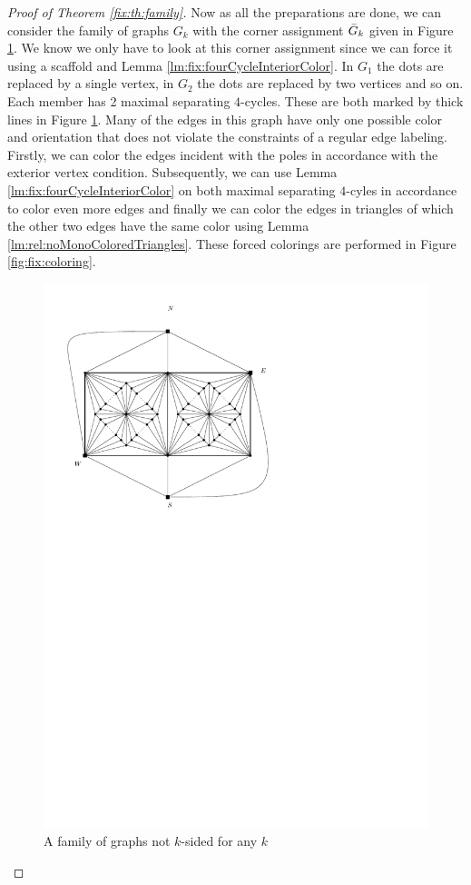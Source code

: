 \begin{proof}[Proof of Theorem \ref{fix:th:family}]
  Now as all the preparations are done, we can consider the family of graphs $G_k$ with the corner assignment $\bar{G}_k$ given in Figure \ref{fig:fix:manymany0}.
  We know we only have to look at this corner assignment since we can force it using a scaffold and Lemma \ref{lm:fix:fourCycleInteriorColor}.
  In $G_1$ the dots are replaced by a single vertex, in $G_2$ the dots are replaced by two vertices and so on.
  Each member has 2 maximal separating $4$-cycles.
  These are both marked by thick lines in Figure \ref{fig:fix:manymany0}.
  Many of the edges in this graph have only one possible color and orientation that does not violate the constraints of a regular edge labeling.
  Firstly, we can color the edges incident with the poles in accordance with the exterior vertex condition.
  Subsequently, we can use Lemma \ref{lm:fix:fourCycleInteriorColor} on both maximal separating $4$-cyles in accordance to color even more edges and finally we can color the edges in triangles of which the other two edges have  the same color using Lemma \ref{lm:rel:noMonoColoredTriangles}.
  These forced colorings are performed in Figure \ref{fig:fix:coloring}.

  \begin{figure}[t]
    \centering
    \includegraphics[scale=1]{fixExtension/img/manymanybase}
    \caption{A family of graphs not $k$-sided for any $k$}
    \label{fig:fix:manymany0}
  \end{figure}





\end{proof}
